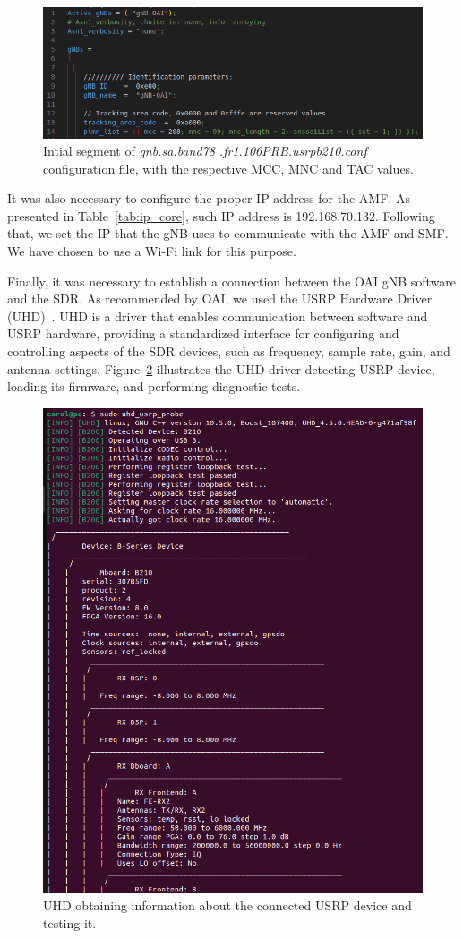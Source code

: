 \begin{figure}[H]
    \centering
    \includegraphics[width=0.7\linewidth]{figures/gnb_conf}
    \caption{Intial segment of \textit{gnb.sa.band78
    .fr1.106PRB.usrpb210.conf} configuration file, with the respective MCC, MNC and TAC values.}
    \label{fig:gnb_conf}
\end{figure}

It was also necessary to configure the proper IP address for the AMF\@.
As presented in Table~\ref{tab:ip_core}, such IP address is 192.168.70.132.
Following that, we set the IP that the gNB uses to communicate with the AMF and SMF\@.
We have chosen to use a Wi-Fi link for this purpose.


Finally, it was necessary to establish a connection between the OAI gNB software and the SDR\@.
As recommended by OAI, we used the USRP Hardware Driver (UHD)~\cite{uhdusrpdriver}.
UHD is a driver that enables communication between software and USRP hardware, providing a standardized interface for configuring and controlling aspects of the SDR devices, such as frequency, sample rate, gain, and antenna settings.
Figure~\ref{fig:uhd_probe} illustrates the UHD driver detecting USRP device, loading its firmware, and performing diagnostic tests.

\begin{figure}[H]
    \centering
    \includegraphics[width=0.5\linewidth]{figures/uhd_usrp_probe}
    \caption{UHD obtaining information about the connected USRP device and testing it.}
    \label{fig:uhd_probe}
\end{figure}

